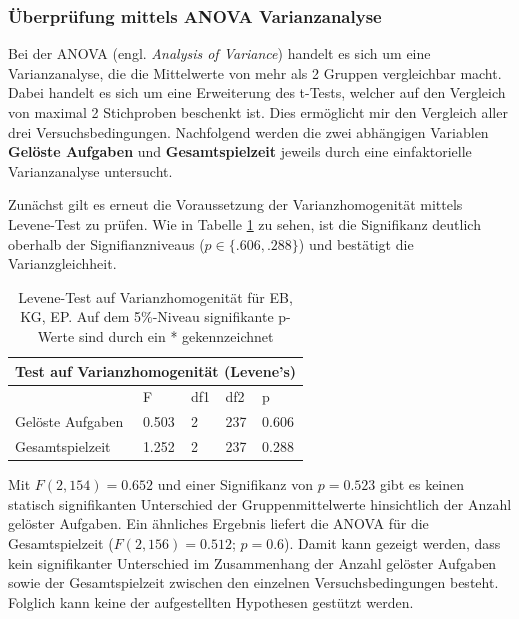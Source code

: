 \subsubsection{Überprüfung mittels ANOVA Varianzanalyse }
Bei der ANOVA (engl. \textit{Analysis of Variance}) handelt es sich um eine Varianzanalyse, die die Mittelwerte von mehr als 2 Gruppen vergleichbar macht. Dabei handelt es sich um eine Erweiterung des t-Tests, welcher auf den Vergleich von maximal 2 Stichproben beschenkt ist. Dies ermöglicht mir den Vergleich aller drei Versuchsbedingungen. Nachfolgend werden die zwei abhängigen Variablen \textbf{Gelöste Aufgaben} und \textbf{Gesamtspielzeit} jeweils durch eine einfaktorielle Varianzanalyse untersucht.

Zunächst gilt es erneut die Voraussetzung der Varianzhomogenität mittels Levene-Test zu prüfen. Wie in Tabelle \ref{levene_amova} zu sehen, ist die Signifikanz deutlich oberhalb der Signifianzniveaus ($p\in \{.606, .288\}$) und bestätigt die Varianzgleichheit.

\begin{table}[htbp]
\centering
\begin{tabular}{ |p{4cm}||p{2.0cm}|p{2.0cm}|p{2.0cm}|p{2.0cm}| }
 \hline
 \multicolumn{5}{|c|}{Test auf Varianzhomogenität (Levene's)} \\
 \hline
 & F & df1 &df2 &p \\
 \hline
  Gelöste Aufgaben      & 0.503     & 2 &   237 & 0.606\\
  Gesamtspielzeit       & 1.252     & 2 &   237 & 0.288\\
 \hline
\end{tabular}
\caption{Levene-Test auf Varianzhomogenität für EB, KG, EP. Auf dem 5\%-Niveau signifikante p-Werte sind durch ein * gekennzeichnet}
\label{levene_amova}
\end{table}

Mit $F(2,154) = 0.652$ und einer Signifikanz von $p=0.523$ gibt es keinen statisch signifikanten Unterschied der Gruppenmittelwerte hinsichtlich der Anzahl gelöster Aufgaben. Ein ähnliches Ergebnis liefert die ANOVA für die Gesamtspielzeit ($F(2, 156)=0.512$; $p=0.6$). Damit kann gezeigt werden, dass kein signifikanter Unterschied im Zusammenhang der Anzahl gelöster Aufgaben sowie der Gesamtspielzeit zwischen den einzelnen Versuchsbedingungen besteht. Folglich kann keine der aufgestellten Hypothesen gestützt werden.

